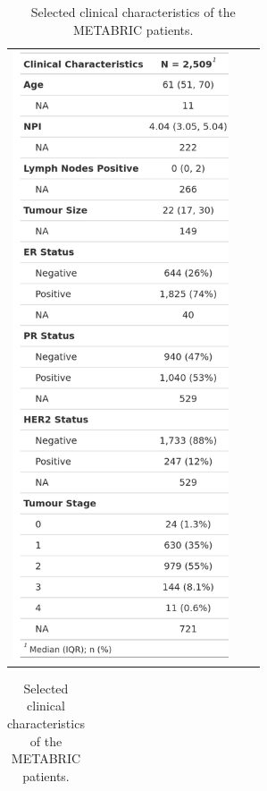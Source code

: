 \vfill 
\begin{table}[!h]
\caption{Selected clinical characteristics of the METABRIC patients.}
\begin{minipage}[c]{0.5\textwidth}
\centering
\begin{tabular}{ccc}
\includegraphics[height = 18cm]{../tables/Introduction/Table1_Clin_pt1.png}
\end{tabular}
\end{minipage}
\begin{minipage}[c]{0.5\textwidth}
\centering
\begin{tabular}{ccc}

\end{tabular}
\end{minipage}
\end{table}
